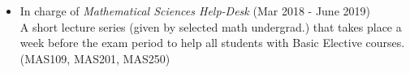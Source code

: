 \documentclass[10pt,a4]{article}
\begin{document}
\begin{small}
\begin{itemize}
	\item In charge of {\it Mathematical Sciences Help-Desk} (Mar 2018 - June 2019) \\
	A short lecture series (given by selected math undergrad.) that takes place a week before the exam period to help all students with Basic Elective courses. (MAS109, MAS201, MAS250)
\end{itemize}

\newpage
\pagestyle{fancy}
\lhead{\textcolor{gray}{\it Junghyun Lee}}
\fancyfoot[C]{}


\end{small}
\end{document}
